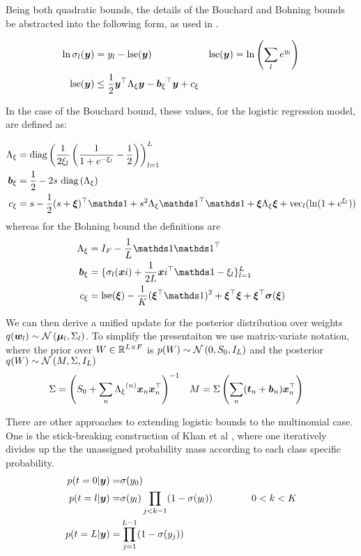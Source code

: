 Being both quadratic bounds, the details of the Bouchard and Bohning bounds be abstracted into the following form, as used in \cite{Khan2010}.

\begin{align}
\ln \sigma_l(\bm y) & = y_l - \text{lse} (\bm y) & \text{lse} (\bm y) & = \ln \left(\sum_l e^{y_l} \right)\\
\text{lse}(\bm y) & \leq \frac{1}{2} \bm y^\top { \Lambda_{\xi} } \bm y - { \bm b_{\xi} }^\top\bm y + { c_{\xi} }
\end{align}

In the case of the Bouchard bound, these values, for the logistic regression model, are defined as:

\begin{align}
\Axi & = \diag{\frac{1}{2\xi_l} \left( \frac{1}{1 + e^{-\xi_l}} - \half\right) }_{l=1}^L  \\
\bxi & = \half - 2 s \text{ }\diag{\Axi} \\
\cxi & = s - \half (s + \vv{\xi})\T\one + s^2\Axi \one\T\one + \vv{\xi}\Axi\vv{\xi} + \text{vec}_l(\ln (1 + e^{\xi_l}))
\end{align}
whereas for the Bohning bound the definitions are
\begin{align}
\Axi & = I_F - \frac{1}{L} \one \one \T \\
\bxi & = \{ \sigma_l(\vv{xi}) + \frac{1}{2L} \vv{xi}\T\one - \xi_l \}_{l=1}^{L} \\
\cxi & = \lse(\vv{\xi}) - \frac{1}{K}(\vv{\xi}\T\one)^2 + \vv{\xi}\T\vv{\xi} + \vv{\xi}\T\vv{\sigma}(\vv{\xi})
\end{align}

We can then derive a unified update for the posterior distribution over weights $q(\bm w_l) \sim \mathcal{N} \left( {\bm \mu_l}, {\Sigma_l} \right)$. To simplify the presentaiton we use matrix-variate notation, where the prior over $W \in { \mathbb{R}^{L \times F} }$ is $p(W) \sim \mathcal{N} \left(0, S_0, I_L\right)$ and the posterior $q(W) \sim \mathcal{N} \left(M, \Sigma, I_L\right)$
\begin{align}
\Sigma &= {\left( S_0 + \sum_n { \Lambda_{\xi} }^{(n)}\bm x_n\bm x_n^\top \right)}^{-1} & M &= \Sigma \left(\sum_n (\bm t_n + \bm b_n)\bm x_n^\top\right)
\end{align}


\newcommand \C { \mathcal{C} }

There are other approaches to extending logistic bounds to the multinomial case. One is the stick-breaking construction of Khan et al \cite{Khan2012stick}, where one iteratively divides up the the unassigned probability mass according to each class specific probability.
\begin{align}
\begin{split}
p(t = 0 | \bm y) = & \sigma(y_0) \\
p(t = l | \bm y) = & \sigma(y_l) \prod_{j < k - 1} (1 - \sigma(y_l)) \qquad\qquad 0 < k < K \\
p (t = L | \bm y) = & \prod_{j = 1}^{L - 1} (1 - \sigma(y_j))
\end{split}
\end{align}

